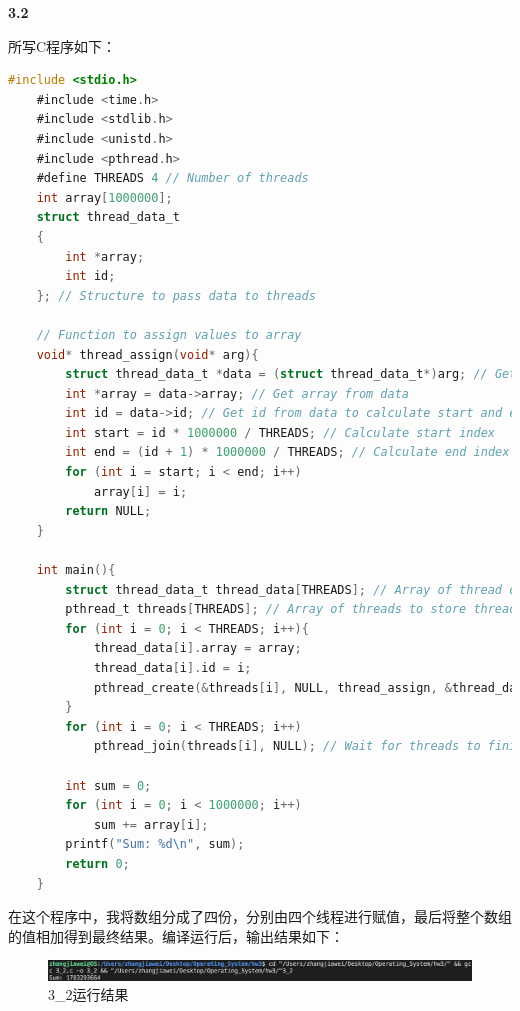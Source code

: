 \documentclass[UTF8]{article}
\newcommand{\tbf}[1]{\textbf{#1}}
\begin{document}
\tbf{3.2}

所写C程序如下：

\begin{lstlisting}[language=C]
    #include <stdio.h>
    #include <time.h>
    #include <stdlib.h>
    #include <unistd.h>
    #include <pthread.h>
    #define THREADS 4 // Number of threads
    int array[1000000];
    struct thread_data_t
    {
        int *array;
        int id;
    }; // Structure to pass data to threads
    
    // Function to assign values to array
    void* thread_assign(void* arg){
        struct thread_data_t *data = (struct thread_data_t*)arg; // Get data from argument
        int *array = data->array; // Get array from data
        int id = data->id; // Get id from data to calculate start and end index of current thread
        int start = id * 1000000 / THREADS; // Calculate start index
        int end = (id + 1) * 1000000 / THREADS; // Calculate end index
        for (int i = start; i < end; i++)
            array[i] = i;
        return NULL;
    }
    
    int main(){
        struct thread_data_t thread_data[THREADS]; // Array of thread data to pass to threads
        pthread_t threads[THREADS]; // Array of threads to store thread ids
        for (int i = 0; i < THREADS; i++){
            thread_data[i].array = array;
            thread_data[i].id = i;
            pthread_create(&threads[i], NULL, thread_assign, &thread_data[i]); // Create threads and pass data to them
        }
        for (int i = 0; i < THREADS; i++)
            pthread_join(threads[i], NULL); // Wait for threads to finish
    
        int sum = 0;
        for (int i = 0; i < 1000000; i++)
            sum += array[i];
        printf("Sum: %d\n", sum);
        return 0;
    }
\end{lstlisting}

在这个程序中，我将数组分成了四份，分别由四个线程进行赋值，最后将整个数组的值相加得到最终结果。编译运行后，输出结果如下：

\begin{figure}[H]
    \centering
    \includegraphics[width=\textwidth]{3_2.png}
    \caption{3_2运行结果}
\end{figure}
\end{document}
